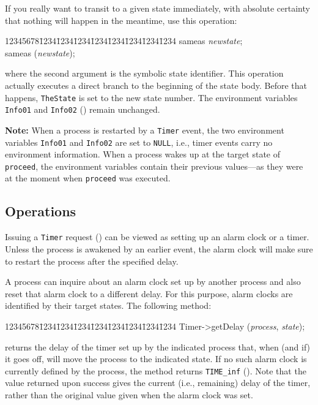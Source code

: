 If you really want to transit to a given state immediately, with absolute
certainty that nothing will happen in the meantime, use this
operation:
{\tt\begin{tabbing}
12345678\=1234\=1234\=1234\=1234\=1234\=1234\=1234\=1234\kill
\>sameas {\em newstate};\\
\>sameas ({\em newstate\/});
\end{tabbing}}
\noindent
where the second argument is the symbolic state identifier.
This operation actually executes a direct branch to the beginning of the state
body.
Before that happens, {\tt TheState} is set to the new state number.
The environment variables {\tt Info01} and {\tt Info02} ()
remain unchanged.

\medskip

\noindent
{\bf Note:} When a process is restarted by a {\tt Timer} event, the
two environment variables {\tt Info01} and {\tt Info02} are set to
{\tt NULL}, i.e., timer events carry no environment information.
When a process wakes up at the target state of {\tt proceed}, the
environment variables contain their previous values---as they were at the
moment when {\tt proceed} was executed.

\subsection{Operations}
\label{rm_ti_op}

Issuing a {\tt Timer} request ()
can be viewed as setting up an alarm clock or a timer.
Unless the process is awakened by an earlier event, the alarm clock will make
sure to restart the process after the specified delay.

A process can inquire about an alarm clock set up by another process and
also reset that alarm clock to a different delay.
For this purpose, alarm clocks are identified by their target states.
The following method:
{\tt\begin{tabbing}
12345678\=1234\=1234\=1234\=1234\=1234\=1234\=1234\=1234\kill
\>Timer->getDelay ({\em process}, {\em state\/});
\end{tabbing}}
\noindent
returns the delay of the timer set up by the indicated process that,
when (and if) it goes off, will move the process to the indicated state.
If no such alarm clock is currently defined by the process, the method
returns {\tt TIME\_inf} ().
Note that the value returned upon success gives the current (i.e., remaining)
delay of the timer, rather than the original value given when the
alarm clock was set.

